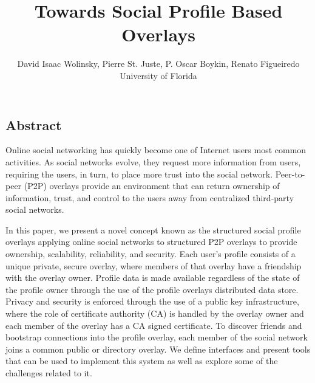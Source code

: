 \documentclass[letterpaper,twocolumn,10pt]{article}
\begin{document}
\title{\Large \bf Towards Social Profile Based Overlays}

\author{
David Isaac Wolinsky,
Pierre St. Juste,
P. Oscar Boykin,
Renato Figueiredo
\\
University of Florida
\\
}




\subsection*{Abstract}
Online social networking has quickly become one of Internet users most common
activities. As social networks evolve, they request more information from users,
requiring the users, in turn, to place more trust into the social network.
Peer-to-peer (P2P) overlays provide an environment that can return ownership of
information, trust, and control to the users away from centralized third-party
social networks.

In this paper, we present a novel concept known as the structured social profile
overlays applying online social networks to structured P2P overlays to provide
ownership, scalability, reliability, and security.  Each user's profile consists
of a unique private, secure overlay, where members of that overlay have a
friendship with the overlay owner. Profile data is made available regardless of
the state of the profile owner through the use of the profile overlays
distributed data store.  Privacy and security is enforced through the use of a
public key infrastructure, where the role of certificate authority (CA) is
handled by the overlay owner and each member of the overlay has a CA signed
certificate.  To discover friends and bootstrap connections into the profile
overlay, each member of the social network joins a common public or directory
overlay.  We define interfaces and present tools that can be used to implement
this system as well as explore some of the challenges related to it.
\end{document}
